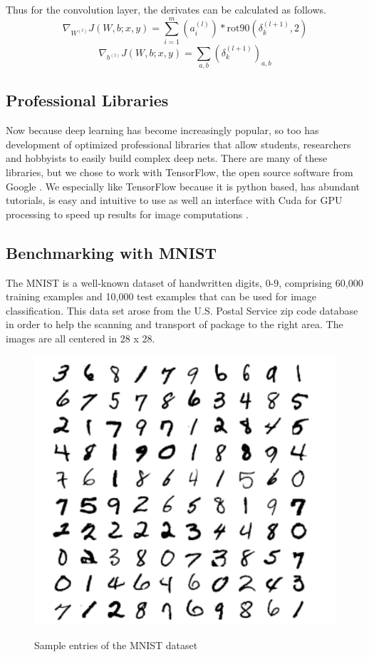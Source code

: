 \documentclass[12pt, twocolumn]{article}
\begin{document}
Thus for the convolution layer, the derivates can be calculated as follows.
\begin{equation}
\nabla_{W^{(l)}}J(W,b;x,y) = \sum_{i=1}^m (a^{(l)}_i) \ast \textrm{rot90}( \delta^{(l+1)}_k,2)
\end{equation}
\begin{equation}
\nabla_{b^{(l)}}J(W,b;x,y)= \sum_{a,b}(\delta^{(l+1)}_k)_{a,b}
\end{equation}


\subsection{Professional Libraries}

Now because deep learning has become increasingly popular, so too has development of optimized professional libraries that allow students, researchers and hobbyists to easily build complex deep nets. There are many of these libraries, but we chose to work with TensorFlow, the open source software from Google \cite{TensorFlowGH}. We especially like TensorFlow because it is python based, has abundant tutorials, is easy and intuitive to use as well an interface with Cuda for GPU processing to speed up results for image computations \cite{TensorFlowWeb}. 



\subsection{Benchmarking with MNIST}


The MNIST is a well-known dataset of handwritten digits, 0-9, comprising 60,000 training examples and 10,000 test examples \cite{MNIST}  that can be used for image classification.  This data set arose from the U.S. Postal Service zip code database in order to help the scanning and transport of package to the right area. The images are all centered in 28 x 28.

\begin{figure}
\includegraphics[scale=.8]{MNISTnos.png}
\label{fig:MNISTex}
\caption{Sample entries of the MNIST dataset \cite{LeCun1998}}
\end{figure}
\end{document}
